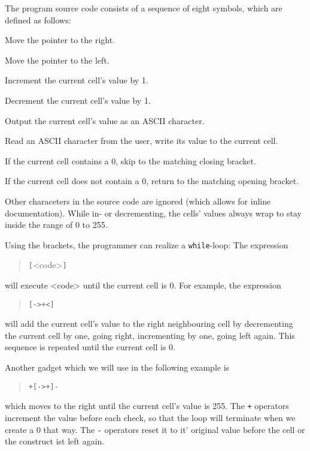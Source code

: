 The program source code consists of a sequence of eight symbols, which are defined as follows:

\begin{description}[labelsep=1em]
    \item[\texttt{>}] Move the pointer to the right.
    \item[\texttt{<}] Move the pointer to the left.
    \item[\texttt{+}] Increment the current cell's value by 1.
    \item[\texttt{-}] Decrement the current cell's value by 1.
    \item[\texttt{.}] Output the current cell's value as an ASCII character.
    \item[\texttt{,}] Read an ASCII character from the user, write its value to the current cell.
    \item[\texttt{[}] If the current cell contains a 0, skip to the matching closing bracket.
    \item[\texttt{]}] If the current cell does not contain a 0, return to the matching opening bracket.
\end{description}

Other characeters in the source code are ignored (which allows for inline documentation). While in- or decrementing, the cells' values always wrap to stay inside the range of 0 to 255.

Using the brackets, the programmer can realize a \texttt{while}-loop: The expression

\begin{quotation}
    \texttt{[}<code>\texttt{]}
\end{quotation}

will execute <code> until the current cell is 0. For example, the expression

\begin{quotation}
    \texttt{[->+<]}
\end{quotation}

will add the current cell's value to the right neighbouring cell by decrementing the current cell by one, going right, incrementing by one, going left again. This sequence is repeated until the current cell is 0.

Another gadget which we will use in the following example is

\begin{quotation}
    \texttt{+[->+]-}
\end{quotation}

which moves to the right until the current cell's value is 255. The \texttt{+} operators increment the value before each check, so that the loop will terminate when we create a 0 that way. The \texttt{-} operators reset it to it' original value before the cell or the construct ist left again.

